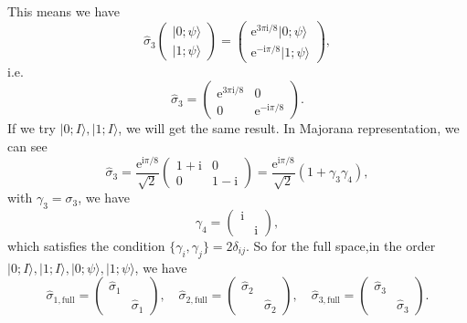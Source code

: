 This means we have
\begin{equation*}
\hat{\sigma }_{3}\begin{pmatrix}
|0;\psi \rangle \\
|1;\psi \rangle 
\end{pmatrix} =\begin{pmatrix}
\mathrm{e}^{3\pi \mathrm{i} /8} |0;\psi \rangle \\
\mathrm{e}^{-\mathrm{i} \pi /8} |1;\psi \rangle 
\end{pmatrix} ,
\end{equation*}
i.e.
\begin{equation*}
\hat{\sigma }_{3} =\begin{pmatrix}
\mathrm{e}^{3\pi \mathrm{i} /8} & 0\\
0 & \mathrm{e}^{-\mathrm{i} \pi /8}
\end{pmatrix} .
\end{equation*}
If we try $|0;I \rangle ,|1;I \rangle $, we will get the same result. In Majorana representation, we can see
\begin{equation*}
\hat{\sigma }_{3} =\frac{\mathrm{e}^{\mathrm{i} \pi /8}}{\sqrt{2}}\begin{pmatrix}
1+\mathrm{i} & 0\\
0 & 1-\mathrm{i}
\end{pmatrix} =\frac{\mathrm{e}^{\mathrm{i} \pi /8}}{\sqrt{2}}( 1+\gamma _{3} \gamma _{4}) ,
\end{equation*}
with $\gamma _{3} =\sigma _{3}$, we have
\begin{equation*}
\gamma _{4} =\begin{pmatrix}
\mathrm{i} & \\
 & \mathrm{i}
\end{pmatrix} ,
\end{equation*}
which satisfies the condition $\{\gamma _{i} ,\gamma _{j}\} =2\delta _{ij}$. So for the full space,in the order $|0;I \rangle ,|1;I \rangle ,|0;\psi \rangle ,|1;\psi \rangle $, we have
\begin{equation*}
\hat{\sigma }_{1,\text{full}} =\begin{pmatrix}
\hat{\sigma }_{1} & \\
 & \hat{\sigma }_{1}
\end{pmatrix} ,\quad \hat{\sigma }_{2,\text{full}} =\begin{pmatrix}
\hat{\sigma }_{2} & \\
 & \hat{\sigma }_{2}
\end{pmatrix} ,\quad \hat{\sigma }_{3,\text{full}} =\begin{pmatrix}
\hat{\sigma }_{3} & \\
 & \hat{\sigma }_{3}
\end{pmatrix} .
\end{equation*}


